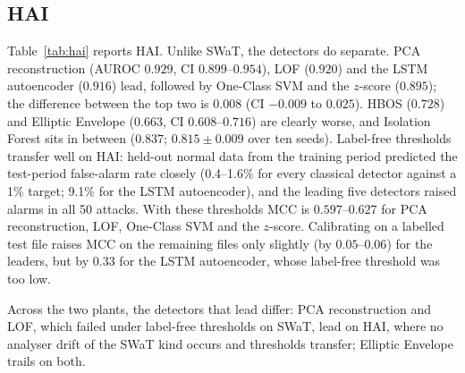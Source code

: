 \documentclass[11pt]{article}
\begin{document}
\subsection{HAI}
\label{sec:hai}
Table~\ref{tab:hai} reports HAI. Unlike SWaT, the detectors do separate. PCA
reconstruction (AUROC $0.929$, CI $0.899$--$0.954$), LOF ($0.920$) and the LSTM
autoencoder ($0.916$) lead, followed by One-Class SVM and the $z$-score ($0.895$);
the difference between the top two is $0.008$ (CI $-0.009$ to $0.025$). HBOS
($0.728$) and Elliptic Envelope ($0.663$, CI $0.608$--$0.716$) are clearly worse,
and Isolation Forest sits in between ($0.837$; $0.815\pm0.009$ over ten seeds).
Label-free thresholds transfer well on HAI: held-out normal data from the training
period predicted the test-period false-alarm rate closely (0.4--1.6\% for every
classical detector against a 1\% target; 9.1\% for the LSTM autoencoder), and the
leading five detectors raised alarms in all 50 attacks. With these thresholds MCC is
$0.597$--$0.627$ for PCA reconstruction, LOF, One-Class SVM and the $z$-score.
Calibrating on a labelled test file raises MCC on the remaining files only slightly
(by $0.05$--$0.06$) for the leaders, but by $0.33$ for the LSTM autoencoder, whose
label-free threshold was too low.

Across the two plants, the detectors that lead differ: PCA reconstruction and LOF,
which failed under label-free thresholds on SWaT, lead on HAI, where no analyser drift of
the SWaT kind occurs and thresholds transfer; Elliptic Envelope trails on both.
\end{document}
